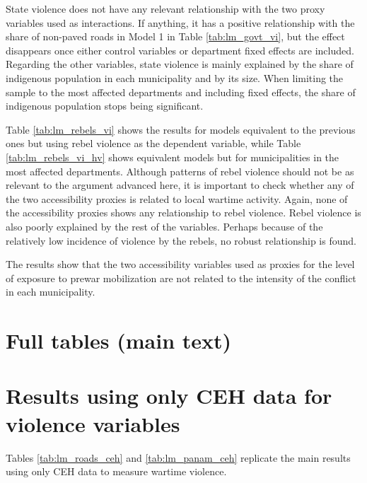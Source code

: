 \documentclass[a4paper, 12pt, notitlepage]{article}
\begin{document}
State violence does not have any relevant relationship with the two proxy variables used as interactions.
If anything, it has a positive relationship with the share of non-paved roads in Model 1 in Table \ref{tab:lm_govt_vi}, but the effect disappears once either control variables or department fixed effects are included.
Regarding the other variables, state violence is mainly explained by the share of indigenous population in each municipality and by its size.
When limiting the sample to the most affected departments and including fixed effects, the share of indigenous population stops being significant.

Table \ref{tab:lm_rebels_vi} shows the results for models equivalent to the previous ones but using rebel violence as the dependent variable, while Table \ref{tab:lm_rebels_vi_hv} shows equivalent models but for municipalities in the most affected departments.
Although patterns of rebel violence should not be as relevant to the argument advanced here, it is important to check whether any of the two accessibility proxies is related to local wartime activity.
Again, none of the accessibility proxies shows any relationship to rebel violence.
Rebel violence is also poorly explained by the rest of the variables.
Perhaps because of the relatively low incidence of violence by the rebels, no robust relationship is found.

The results show that the two accessibility variables used as proxies for the level of exposure to prewar mobilization are not related to the intensity of the conflict in each municipality.






\clearpage
\section{Full tables (main text)}\label{app:results_tablong}







\clearpage
\section{Results using only CEH data for violence variables}\label{app:results_ceh}

Tables \ref{tab:lm_roads_ceh} and \ref{tab:lm_panam_ceh} replicate the main results using only CEH data to measure wartime violence.
\end{document}
